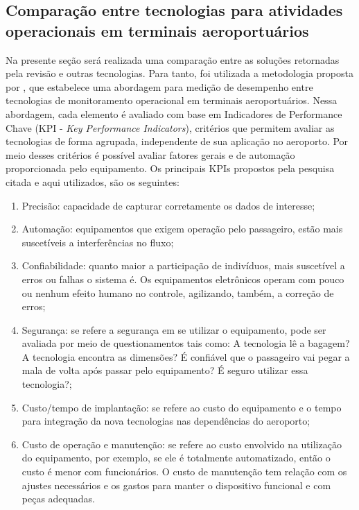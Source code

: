 \subsection{Comparação entre tecnologias para atividades operacionais em terminais aeroportuários}
\label{sec_Comparação entre tecnologias}

    Na presente seção será realizada uma comparação entre as soluções retornadas pela revisão e outras tecnologias. Para tanto, foi utilizada a metodologia proposta por , que estabelece uma abordagem para medição de desempenho entre tecnologias de monitoramento operacional em terminais aeroportuários. Nessa abordagem, cada elemento é avaliado com base em Indicadores de Performance Chave (KPI - \textit{Key Performance Indicators}), critérios que permitem avaliar as tecnologias de forma agrupada, independente de sua aplicação no aeroporto. Por meio desses critérios é possível avaliar fatores gerais e de automação proporcionada pelo equipamento. Os principais KPIs propostos pela pesquisa citada e aqui utilizados, são os seguintes:
    
    \begin{enumerate}
        \item Precisão: capacidade de capturar corretamente os dados de interesse;
        \item Automação: equipamentos que exigem operação pelo passageiro, estão mais suscetíveis a interferências no fluxo;
        \item Confiabilidade: quanto maior a participação de indivíduos, mais suscetível a erros ou falhas o sistema é. Os equipamentos eletrônicos operam com pouco ou nenhum efeito humano no controle, agilizando, também, a correção de erros;
        \item Segurança: se refere a segurança em se utilizar o equipamento, pode ser avaliada por meio de questionamentos tais como:  A tecnologia lê a bagagem? A tecnologia encontra as dimensões? É confiável  que o passageiro vai pegar a mala de volta após passar pelo equipamento? É seguro utilizar essa tecnologia?;
        \item Custo/tempo de implantação: se refere ao custo do equipamento e o tempo para integração da nova tecnologias nas dependências do aeroporto;
        \item Custo de operação e manutenção: se refere ao custo envolvido na utilização do equipamento, por exemplo, se ele é totalmente automatizado, então o custo é menor com funcionários. O custo de manutenção tem relação com os ajustes necessários e os gastos para manter o dispositivo funcional e com peças adequadas.
    \end{enumerate}


